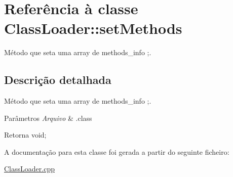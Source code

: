 \hypertarget{class_class_loader_1_1set_methods}{}\section{Referência à classe Class\+Loader\+:\+:set\+Methods}
\label{class_class_loader_1_1set_methods}


Método que seta uma array de methods\+\_\+info ;.  




\subsection{Descrição detalhada}
Método que seta uma array de methods\+\_\+info ;. 


\begin{DoxyParams}{Parâmetros}
{\em Arquivo} & .class \\
\hline
\end{DoxyParams}
\begin{DoxyReturn}{Retorna}
void; 
\end{DoxyReturn}


A documentação para esta classe foi gerada a partir do seguinte ficheiro\+:\begin{DoxyCompactItemize}
\item 
\hyperlink{_class_loader_8cpp}{Class\+Loader.\+cpp}\end{DoxyCompactItemize}
